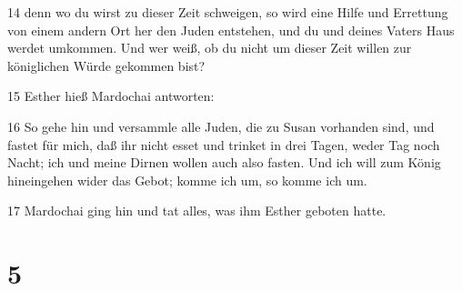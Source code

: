 \par 14 denn wo du wirst zu dieser Zeit schweigen, so wird eine Hilfe und Errettung von einem andern Ort her den Juden entstehen, und du und deines Vaters Haus werdet umkommen. Und wer weiß, ob du nicht um dieser Zeit willen zur königlichen Würde gekommen bist?
\par 15 Esther hieß Mardochai antworten:
\par 16 So gehe hin und versammle alle Juden, die zu Susan vorhanden sind, und fastet für mich, daß ihr nicht esset und trinket in drei Tagen, weder Tag noch Nacht; ich und meine Dirnen wollen auch also fasten. Und ich will zum König hineingehen wider das Gebot; komme ich um, so komme ich um.
\par 17 Mardochai ging hin und tat alles, was ihm Esther geboten hatte.

\chapter{5}

